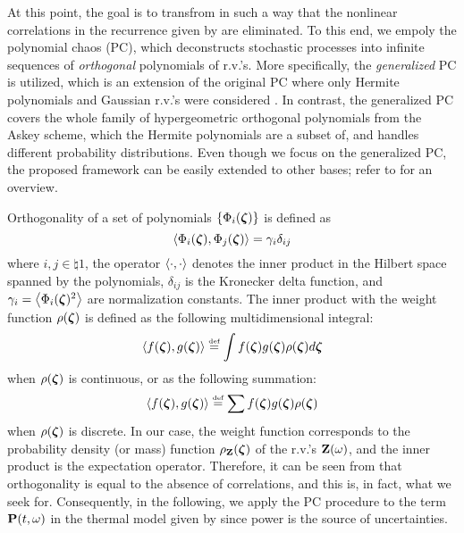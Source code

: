 At this point, the goal is to transfrom  in such a way that the nonlinear correlations in the recurrence given by  are eliminated. To this end, we empoly the polynomial chaos (PC), which deconstructs stochastic processes into infinite sequences of \emph{orthogonal} polynomials of r.v.'s. More specifically, the \emph{generalized} PC \cite{xiu2002} is utilized, which is an extension of the original PC where only Hermite polynomials and Gaussian r.v.'s were considered \cite{ghanem1991}. In contrast, the generalized PC covers the whole family of hypergeometric orthogonal polynomials from the Askey scheme, which the Hermite polynomials are a subset of, and handles different probability distributions. Even though we focus on the generalized PC, the proposed framework can be easily extended to other bases; refer to \cite{maitre2010} for an overview.

Orthogonality of a set of polynomials $\{ \Phi_i(\boldsymbol{\zeta}) \}$ is defined as
\begin{equation} \elabel{orthogonality}
  \oInner{\pcb_i(\vz)}{\pcb_j(\vz)} = \pcn_i \delta_{ij}
\end{equation}
where $i,j \in \natural{1}$, the operator $\oInner{\cd}{\cd}$ denotes the inner product in the Hilbert space spanned by the polynomials, $\delta_{ij}$ is the Kronecker delta function, and $\pcn_i = \oInner{\pcb_i(\vz)^2}$ are normalization constants. The inner product with the weight function $\rho(\boldsymbol{\zeta})$ is defined as the following multidimensional integral:
\begin{equation} \elabel{inner-product-integral}
  \oInner{f(\vz)}{g(\vz)} \eqdef \int f(\vz) g(\vz) \PDF(\vz) d\vz
\end{equation}
when $\rho(\boldsymbol{\zeta})$ is continuous, or as the following summation:
\begin{equation} \elabel{inner-product-sum}
  \oInner{f(\vz)}{g(\vz)} \eqdef \sum f(\vz) g(\vz) \PDF(\vz)
\end{equation}
when $\rho(\boldsymbol{\zeta})$ is discrete. In our case, the weight function corresponds to the probability density (or mass) function $\rho_{\mathbf{Z}}(\boldsymbol{\zeta})$ of the r.v.'s $\mathbf{Z}(\omega)$, and the inner product is the expectation operator. Therefore, it can be seen from  that orthogonality is equal to the absence of correlations, and this is, in fact, what we seek for. Consequently, in the following, we apply the PC procedure to the term $\mathbf{P}(t, \omega)$ in the thermal model given by  since power is the source of uncertainties.


